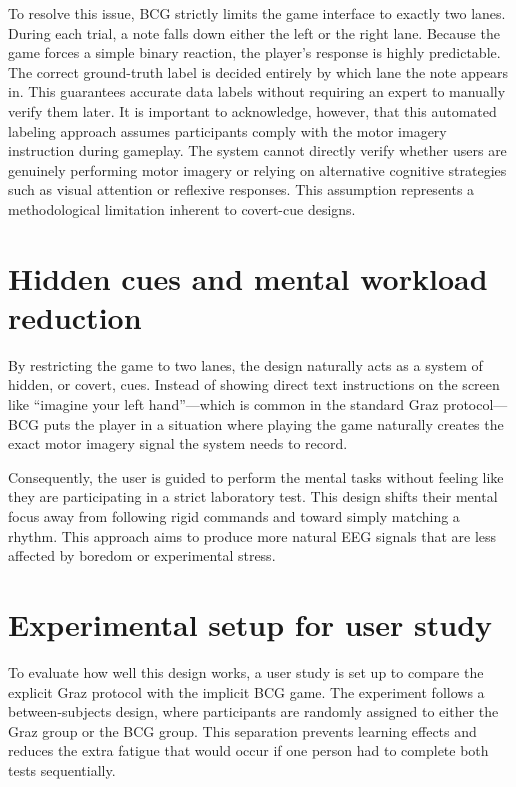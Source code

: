 \documentclass[a4paper, 11pt, openany]{report}
\begin{document}
    To resolve this issue, BCG strictly limits the game interface to exactly two lanes. During each trial, a note falls down either the left or the right lane. Because the game forces a simple binary reaction, the player's response is highly predictable. The correct ground-truth label is decided entirely by which lane the note appears in. This guarantees accurate data labels without requiring an expert to manually verify them later. It is important to acknowledge, however, that this automated labeling approach assumes participants comply with the motor imagery instruction during gameplay. The system cannot directly verify whether users are genuinely performing motor imagery or relying on alternative cognitive strategies such as visual attention or reflexive responses. This assumption represents a methodological limitation inherent to covert-cue designs.


    \section{Hidden cues and mental workload reduction}
    
    By restricting the game to two lanes, the design naturally acts as a system of hidden, or covert, cues. Instead of showing direct text instructions on the screen like ``imagine your left hand''—which is common in the standard Graz protocol—BCG puts the player in a situation where playing the game naturally creates the exact motor imagery signal the system needs to record.

    Consequently, the user is guided to perform the mental tasks without feeling like they are participating in a strict laboratory test. This design shifts their mental focus away from following rigid commands and toward simply matching a rhythm. This approach aims to produce more natural EEG signals that are less affected by boredom or experimental stress.


    \section{Experimental setup for user study}
    
    To evaluate how well this design works, a user study is set up to compare the explicit Graz protocol with the implicit BCG game. The experiment follows a between-subjects design, where participants are randomly assigned to either the Graz group or the BCG group. This separation prevents learning effects and reduces the extra fatigue that would occur if one person had to complete both tests sequentially.
\end{document}
